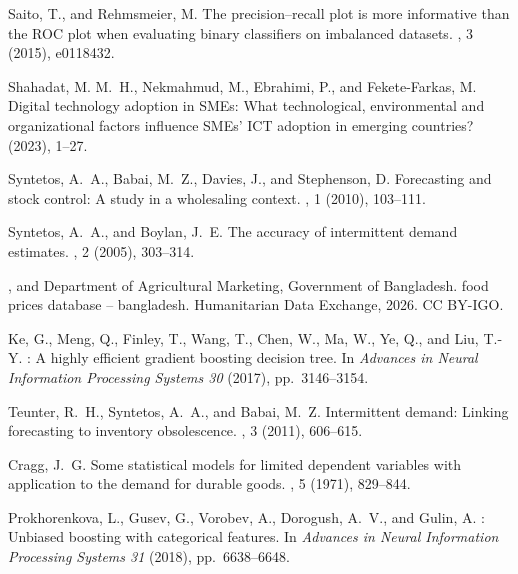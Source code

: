 \documentclass[a4paper,11pt,oneside]{book}
\theoremstyle{plain}
\theoremstyle{definition}
\theoremstyle{remark}
\renewcommand{\newblock}{\hspace{0.25em}}%
\begin{document}
\begin{thebibliography}{10}
{\sc Saito, T., and Rehmsmeier, M.}
\newblock The precision--recall plot is more informative than the {ROC} plot
  when evaluating binary classifiers on imbalanced datasets.
\newblock {\em PLOS ONE 10}, 3 (2015), e0118432.

{\sc Shahadat, M. M.~H., Nekmahmud, M., Ebrahimi, P., and Fekete-Farkas, M.}
\newblock Digital technology adoption in {SMEs}: What technological,
  environmental and organizational factors influence {SMEs}' {ICT} adoption in
  emerging countries?
\newblock {\em Global Business Review\/} (2023), 1--27.

{\sc Syntetos, A.~A., Babai, M.~Z., Davies, J., and Stephenson, D.}
\newblock Forecasting and stock control: A study in a wholesaling context.
\newblock {\em International Journal of Production Economics 127}, 1 (2010),
  103--111.

{\sc Syntetos, A.~A., and Boylan, J.~E.}
\newblock The accuracy of intermittent demand estimates.
\newblock {\em International Journal of Forecasting 21}, 2 (2005), 303--314.

{, and {Department of Agricultural Marketing,
  Government of Bangladesh}}.
\newblock {WFP} food prices database -- bangladesh.
\newblock Humanitarian Data Exchange, 2026.
\newblock CC BY-IGO.

{\sc Ke, G., Meng, Q., Finley, T., Wang, T., Chen, W., Ma, W., Ye, Q., and Liu, T.-Y.}
\newblock {LightGBM}: A highly efficient gradient boosting decision tree.
\newblock In {\em Advances in Neural Information Processing Systems 30\/}
  (2017), pp.~3146--3154.

{\sc Teunter, R.~H., Syntetos, A.~A., and Babai, M.~Z.}
\newblock Intermittent demand: Linking forecasting to inventory obsolescence.
\newblock {\em European Journal of Operational Research 214}, 3 (2011),
  606--615.

{\sc Cragg, J.~G.}
\newblock Some statistical models for limited dependent variables with
  application to the demand for durable goods.
\newblock {\em Econometrica 39}, 5 (1971), 829--844.

{\sc Prokhorenkova, L., Gusev, G., Vorobev, A., Dorogush, A.~V., and Gulin, A.}
\newblock {CatBoost}: Unbiased boosting with categorical features.
\newblock In {\em Advances in Neural Information Processing Systems 31\/}
  (2018), pp.~6638--6648.

\end{thebibliography}
\end{document}
